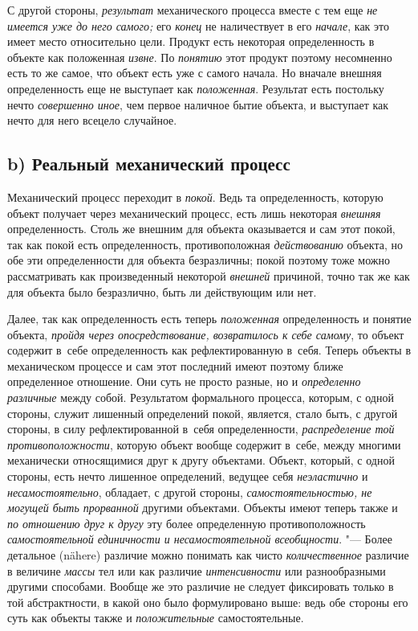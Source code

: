 С другой стороны, {\em результат} механического процесса вместе с тем еще
{\em не имеется уже до него самого;} его {\em конец} не наличествует в его
{\em начале}, как это имеет место относительно цели. Продукт есть некоторая
определенность в объекте как положенная {\em извне}. По {\em понятию}
этот продукт поэтому несомненно есть то же самое, что объект
есть уже с самого начала. Но вначале внешняя определенность еще не
выступает как {\em положенная}. Результат есть постольку нечто
{\em совершенно иное}, чем первое наличное бытие объекта, и выступает
как нечто для него всецело случайное.

\subsection[b) Реальный механический процесс]{b) Реальный механический процесс}

Механический процесс переходит в {\em покой}. Ведь та
определенность, которую объект получает через механический процесс, есть
лишь некоторая {\em внешняя}
определенность. Столь же внешним для объекта оказывается и
сам этот покой, так как покой есть определенность, противоположная
{\em действованию}
объекта, но обе эти определенности для объекта безразличны;
покой поэтому тоже можно рассматривать как произведенный некоторой
{\em внешней} причиной,
точно так же как для объекта было безразлично, быть ли действующим или нет.

Далее, так как определенность есть теперь
{\em положенная}
определенность и понятие объекта,
{\em пройдя через опосредствование,
возвратилось к себе самому}, то объект содержит в~себе
определенность как рефлектированную в~себя. Теперь объекты в
механическом процессе и сам этот последний имеют поэтому ближе определенное
отношение. Они суть не просто разные, но и
{\em определенно различные}
между собой. Результатом формального процесса, которым, с
одной стороны, служит лишенный определений покой, является, стало быть, с
другой стороны, в силу рефлектированной в~себя определенности,
{\em распределение той
противоположности}, которую объект вообще содержит в~себе,
между многими механически относящимися друг к другу объектами. Объект,
который, с одной стороны, есть нечто лишенное определений, ведущее себя
{\em неэластично} и
{\em несамостоятельно},
обладает, с другой стороны,
{\em самостоятельностью, не могущей быть
прорванной }другими объектами. Объекты имеют теперь также и
{\em по отношению друг к другу}
эту более определенную противоположность
{\em самостоятельной единичности и
несамостоятельной всеобщности}. "--- Более детальное (nähere)
различие можно понимать как чисто
{\em количественное}
различие в величине
{\em массы} тел или как
различие {\em интенсивности}
или разнообразными другими способами. Вообще же это различие
не следует фиксировать только в той абстрактности, в какой оно было
формулировано выше: ведь обе стороны его суть как объекты также и
{\em положительные}
самостоятельные.

